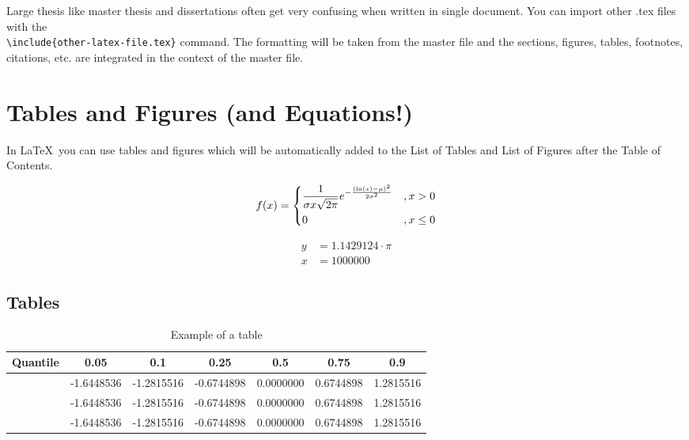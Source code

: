 \documentclass[seminarpaper, grey, english]{mas-thesis-sections}   %
\begin{document}
Large thesis like master thesis and dissertations often get very confusing when written in single document. You can import other .tex files with the\\\texttt{\textbackslash include\{other-latex-file.tex\}} command. The formatting will be taken from the master file and the sections, figures, tables, footnotes, citations, etc. are integrated in the context of the master file.

\section{Tables and Figures (and Equations!)}

In \LaTeX\ you can use tables and figures which will be automatically added to the List of Tables and List of Figures after the Table of Contents.

\begin{equation*}
        f(x) = 
        \begin{dcases}
            \frac{1}{\sigma x \sqrt{2 \pi}} e^{ - \frac{(\ln(x) - \mu)^2}{2 \sigma^2}} & , x > 0 \\
            0 & , x \leq 0
        \end{dcases}
\end{equation*}

\begin{align}
	y &= 1.1429124 \cdot \pi \\
	x &= 1000000
\end{align}

\subsection{Tables}

\begin{table}[ht]
\begin{center}
        \begin{tabular}{
            S[table-column-width=10mm]
            S[table-format=-1.6]
            S[table-format=-1.6]
            S[table-format=-1.6]
            S[table-format=-1.6]
            S[table-format=-1.6]
            S[table-format=-1.6]}
            \toprule
            {Quantile} & 0.05 & 0.1 & 0.25 & 0.5 & 0.75 & 0.9 \\ 
            \midrule
             & -1.6448536 & -1.2815516 & -0.6744898 & 0.0000000 & 0.6744898 & 1.2815516 \\ 
             & -1.6448536 & -1.2815516 & -0.6744898 & 0.0000000 & 0.6744898 & 1.2815516 \\ 
             & -1.6448536 & -1.2815516 & -0.6744898 & 0.0000000 & 0.6744898 & 1.2815516 \\ 
             \bottomrule
        \end{tabular}
	\caption{Example of a table}
	\label{table:1}
\end{center}
\end{table}
\end{document}

